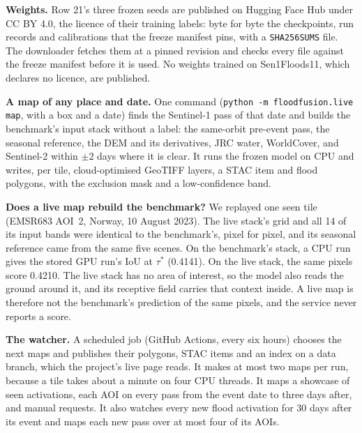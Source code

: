 \documentclass[10pt,twocolumn,a4paper]{article}
\begin{document}
\textbf{Weights.} Row 21's three frozen seeds are published on Hugging Face Hub under CC BY 4.0, the licence of their
training labels: byte for byte the checkpoints, run records and calibrations that the freeze manifest pins, with a
\texttt{SHA256SUMS} file. The downloader fetches them at a pinned revision and checks every file against the freeze
manifest before it is used. No weights trained on Sen1Floods11, which declares no licence, are published.

\textbf{A map of any place and date.} One command (\texttt{python -m floodfusion.live map}, with a box and a date)
finds the Sentinel-1 pass of that date and builds the benchmark's input stack without a label: the same-orbit
pre-event pass, the seasonal reference, the DEM and its derivatives, JRC water, WorldCover, and Sentinel-2 within
$\pm2$ days where it is clear. It runs the frozen model on CPU and writes, per tile, cloud-optimised GeoTIFF layers,
a STAC item and flood polygons, with the exclusion mask and a low-confidence band.

\textbf{Does a live map rebuild the benchmark?} We replayed one seen tile (EMSR683 AOI~2, Norway, 10 August 2023).
The live stack's grid and all 14 of its input bands were identical to the benchmark's, pixel for pixel, and its
seasonal reference came from the same five scenes. On the benchmark's stack, a CPU run gives the stored GPU run's IoU
at $\tau^{*}$ (0.4141). On the live stack, the same pixels score 0.4210. The live stack has no area of interest, so
the model also reads the ground around it, and its receptive field carries that context inside. A live map is
therefore not the benchmark's prediction of the same pixels, and the service never reports a score.

\textbf{The watcher.} A scheduled job (GitHub Actions, every six hours) chooses the next maps and publishes their
polygons, STAC items and an index on a data branch, which the project's live page reads. It makes at most two maps
per run, because a tile takes about a minute on four CPU threads. It maps a showcase of seen activations, each AOI on
every pass from the event date to three days after, and manual requests. It also watches every new flood activation
for 30 days after its event and maps each new pass over at most four of its AOIs.
\end{document}
